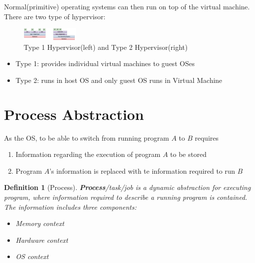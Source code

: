 \documentclass[11pt]{article}
\newtheorem{definition}{Definition}[section]
\theoremstyle{definition}
\begin{document}
Normal(primitive) operating systems can then run on top of the virtual machine.\\
There are two type of hypervisor:
\begin{figure}[h]
\centering
\includegraphics[width = 0.25\textwidth]{1_8.png}
\caption{Type 1 Hypervisor(left) and Type 2 Hypervisor(right)}
\end{figure}
\begin{itemize}[itemsep=0pt]
  \item Type 1: provides individual virtual machines to guest OSes
  \item Type 2: runs in host OS and only guest OS runs in Virtual Machine
\end{itemize}
\section{Process Abstraction}
As the OS, to be able to switch from running program $A$ to $B$ requires
\begin{enumerate}
  \item Information regarding the execution of program $A$ to be stored
  \item Program $A$'s information is replaced with te information required to run $B$
\end{enumerate}
\begin{definition}[Process]
\normalfont \textbf{Process}/task/job is a dynamic abstraction for executing program, where information required to describe a running program is contained. The information includes three components:
\begin{itemize}[itemsep=0pt]
  \item Memory context
  \item Hardware context
  \item OS context
\end{itemize}
\end{definition}
\end{document}
